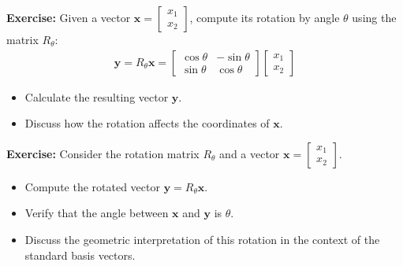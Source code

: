 \begin{frame}
    \textbf{Exercise:} Given a vector $\mathbf{x} = \begin{bmatrix} x_1 \\ x_2 \end{bmatrix}$, compute its rotation by angle $\theta$ using the matrix $R_\theta$:
    \begin{align}
        \mathbf{y} = R_\theta \mathbf{x} = \begin{bmatrix}
            \cos \theta & -\sin \theta \\
            \sin \theta & \cos \theta
        \end{bmatrix} \begin{bmatrix}
            x_1 \\
            x_2
        \end{bmatrix}
    \end{align}
    \begin{itemize}
        \item Calculate the resulting vector $\mathbf{y}$.
        \item Discuss how the rotation affects the coordinates of $\mathbf{x}$.
    \end{itemize}   
\end{frame}
\begin{frame}
    \textbf{Exercise:} Consider the rotation matrix $R_\theta$ and a vector $\mathbf{x} = \begin{bmatrix} x_1 \\ x_2 \end{bmatrix}$.
    \begin{itemize}
        \item Compute the rotated vector $\mathbf{y} = R_\theta \mathbf{x}$.
        \item Verify that the angle between $\mathbf{x}$ and $\mathbf{y}$ is $\theta$.
        \item Discuss the geometric interpretation of this rotation in the context of the standard basis vectors.
    \end{itemize}
\end{frame}
